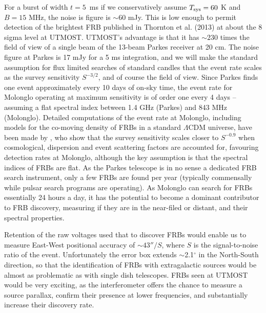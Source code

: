 For a burst of width $t=5$\, ms if we conservatively assume $T_{\rm sys} = 60$ K and $B = 15$ MHz, the noise is figure is $\sim 60$ mJy. This is low enough to permit detection of the brightest FRB published in Thornton et al. (2013) at about the 8 sigma level at UTMOST. UTMOST's advantage is that it has $\sim 230$ times the field of view of a single beam of the 13-beam Parkes receiver at 20 cm. The noise figure at Parkes is 17 mJy for a 5 ms integration, and we will make the standard assumption for flux limited searches of standard candles that the event rate scales as the survey sensitivity $S^{-3/2}$, and of course the field of view. Since Parkes finds one event approximately every 10 days of on-sky time, the event rate for Molonglo operating at maximum sensitivity is of order one every 4 days -- assuming a flat spectral index between 1.4 GHz (Parkes) and 843 MHz (Molonglo). Detailed computations of the event rate at Molonglo, including models for the co-moving density of FRBs in a standard $\Lambda$CDM universe, have been made by \cite{Caleb2015}, who show that the survey sensitivity scales closer to $S^{-0.9}$ when cosmological, dispersion and event scattering factors are accounted for, favouring detection rates at Molonglo, although the key assumption is that the spectral indices of FRBs are flat. As the Parkes telescope is in no sense a dedicated FRB search instrument, only a few FRBs are found per year (typically commensally while pulsar search programs are operating). As Molonglo can search for FRBs essentially 24 hours a day, it has the potential to become a dominant contributor to FRB discovery, measuring if they are in the near-filed or distant, and their spectral properties. 

Retention of the raw voltages used that to discover FRBs would enable us to measure East-West positional accuracy of $\sim 43''/S$, where $S$ is the signal-to-noise ratio of the event. Unfortunately the error box extends $\sim$2.1$^{\circ}$ in the North-South direction, so that the identification of FRBs with extragalactic sources would be almost as problematic as with single dish telescopes. FRBs seen at UTMOST would be very exciting, as the interferometer offers the chance to measure a source parallax, confirm their presence at lower frequencies, and substantially increase their discovery rate. 
  